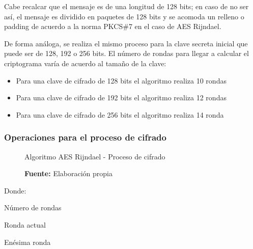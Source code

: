 \documentclass[../main/main.tex]{subfiles}
\begin{document}
    Cabe recalcar que el mensaje es de una longitud de 128 bits; en caso de no ser así, el mensaje es dividido en paquetes de 128 bits y se acomoda un relleno o padding de acuerdo a la norma PKCS\#7 en el caso de AES Rijndael.

    De forma análoga, se realiza el mismo proceso para la clave secreta inicial que puede ser de 128, 192 o 256 bits. El número de rondas para llegar a calcular el criptograma varía de acuerdo al tamaño de la clave:

    \begin{itemize}[noitemsep,nolistsep]
      \item Para una clave de cifrado de 128 bits el algoritmo realiza 10 rondas
      \item Para una clave de cifrado de 192 bits el algoritmo realiza 12 rondas
      \item Para una clave de cifrado de 256 bits el algoritmo realiza 14 ronda
    \end{itemize}

    \subsubsection{Operaciones para el proceso de cifrado}

      \begin{figure}[H]
        \centering
        \caption{Algoritmo AES Rijndael - Proceso de cifrado}
        
        \caption*{\textbf{Fuente:} Elaboración propia}
      \end{figure}

      Donde:

      \begin{description}
        \item[N:] Número de rondas
        \item[i:] Ronda actual
        \item[$N_a$:] Enésima ronda
      \end{description}
\end{document}
